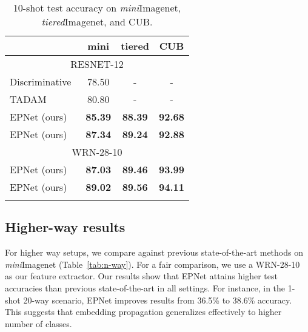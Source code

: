 \documentclass[runningheads]{llncs}
\begin{document}
\begin{table}[h!]
\centering
\caption{10-shot test accuracy on \textit{mini}Imagenet, \textit{tiered}Imagenet, and CUB.}
\begin{tabular}{lccc}
\toprule
 & \textbf{mini} &\textbf{tiered} &\textbf{CUB} \\
  \midrule
\multicolumn{4}{c}{RESNET-12}\\\hline
Discriminative~\cite{bauer2017discriminative}&  78.50 & -     &-     \\
TADAM~\cite{oreshkin2018tadam}& 80.80 & -     &-     \\
EPNet (ours)& \textbf{85.39}  & \textbf{88.39}  &\textbf{92.68}      \\
EPNet (ours) & \textbf{87.34}   &\textbf{89.24}    & \textbf{92.88 }     \\
\midrule
\multicolumn{4}{c}{WRN-28-10}\\
\hline
EPNet (ours)& \textbf{87.03}  & \textbf{89.46}     &\textbf{93.99}     \\
EPNet (ours) & \textbf{89.02}    &\textbf{89.56}   & \textbf{94.11}\\\bottomrule
\label{tab:10shot}
\end{tabular}
\vspace{-1em}
\end{table}

\subsection*{Higher-way results}
For higher way setups, we compare against previous state-of-the-art methods on \textit{mini}Imagenet (Table~\ref{tab:n-way}). For a fair comparison, we use a WRN-28-10~\cite{Zagoruyko2016WRN} as our feature extractor. Our results show that EPNet attains higher test accuracies than previous state-of-the-art in all settings. For instance, in the 1-shot 20-way scenario, EPNet improves results from 36.5\% to 38.6\% accuracy. This suggests that embedding propagation generalizes effectively to higher number of classes. 
\end{document}
